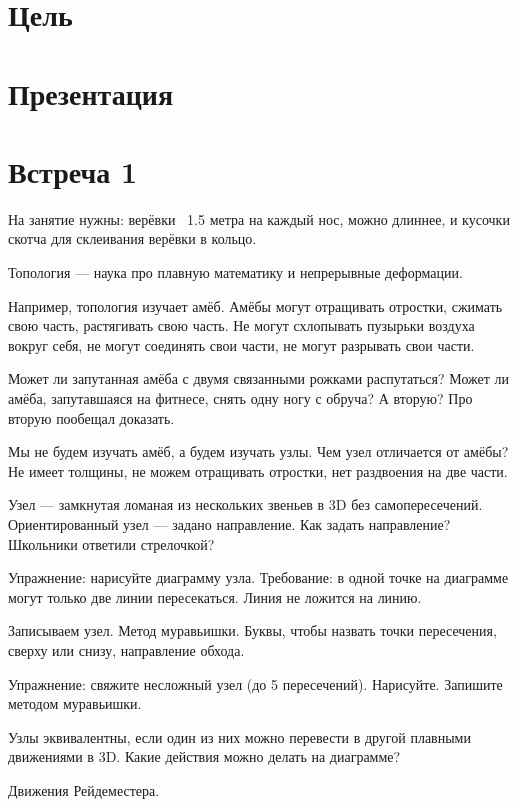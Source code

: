 \documentclass[12pt]{article}
\theoremstyle{definition}
\begin{document}
\tableofcontents{}

\section*{Цель}

\section{Презентация}



\section{Встреча 1}

На занятие нужны: верёвки ~1.5 метра на каждый нос, можно длиннее,
и кусочки скотча для склеивания
верёвки в кольцо.


Топология — наука про плавную математику и непрерывные деформации.

Например, топология изучает амёб. Амёбы могут отращивать отростки, сжимать
свою часть, растягивать свою часть. Не могут схлопывать пузырьки воздуха вокруг себя,
не могут соединять свои части, не могут разрывать свои части.

Может ли запутанная амёба с двумя связанными рожками распутаться?
Может ли амёба, запутавшаяся на фитнесе, снять одну ногу с обруча? А вторую?
Про вторую пообещал доказать.

Мы не будем изучать амёб, а будем изучать узлы. Чем узел отличается от амёбы?
Не имеет толщины, не можем отращивать отростки, нет раздвоения на две части.

Узел — замкнутая ломаная из нескольких звеньев в 3D без самопересечений.
Ориентированный узел — задано направление. Как задать направление?
Школьники ответили стрелочкой?

Упражнение: нарисуйте диаграмму узла.
Требование: в одной точке на диаграмме могут только две линии пересекаться.
Линия не ложится на линию.

Записываем узел. Метод муравьишки. Буквы, чтобы назвать точки пересечения,
сверху или снизу, направление обхода.

Упражнение: свяжите несложный узел (до 5 пересечений). Нарисуйте. Запишите методом
муравьишки.

Узлы эквивалентны, если один из них можно перевести в другой плавными движениями
в 3D. Какие действия можно делать на диаграмме?

Движения Рейдеместера.
\end{document}
